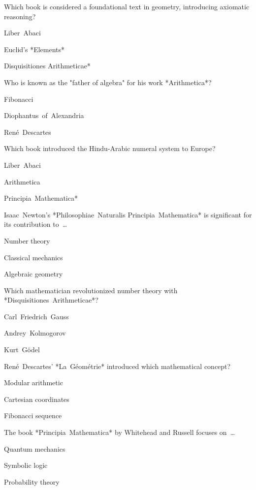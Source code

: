 \begin{enhancedmcq}{Which book is considered a foundational text in geometry, introducing axiomatic reasoning?}
\item Liber Abaci
\item Euclid's *Elements*
\item *Disquisitiones Arithmeticae*

\end{enhancedmcq}
\begin{enhancedmcq}{Who is known as the "father of algebra" for his work *Arithmetica*?}
\item Fibonacci
\item Diophantus of Alexandria
\item René Descartes

\end{enhancedmcq}
\begin{enhancedmcq}{Which book introduced the Hindu‑Arabic numeral system to Europe?}
\item Liber Abaci
\item Arithmetica
\item *Principia Mathematica*

\end{enhancedmcq}
\begin{enhancedmcq}{Isaac Newton's *Philosophiae Naturalis Principia Mathematica* is significant for its contribution to …}
\item Number theory
\item Classical mechanics
\item Algebraic geometry

\end{enhancedmcq}
\begin{enhancedmcq}{Which mathematician revolutionized number theory with *Disquisitiones Arithmeticae*?}
\item Carl Friedrich Gauss
\item Andrey Kolmogorov
\item Kurt Gödel

\end{enhancedmcq}
\begin{enhancedmcq}{René Descartes' *La Géométrie* introduced which mathematical concept?}
\item Modular arithmetic
\item Cartesian coordinates
\item Fibonacci sequence

\end{enhancedmcq}
\begin{enhancedmcq}{The book *Principia Mathematica* by Whitehead and Russell focuses on …}
\item Quantum mechanics
\item Symbolic logic
\item Probability theory

\end{enhancedmcq}
